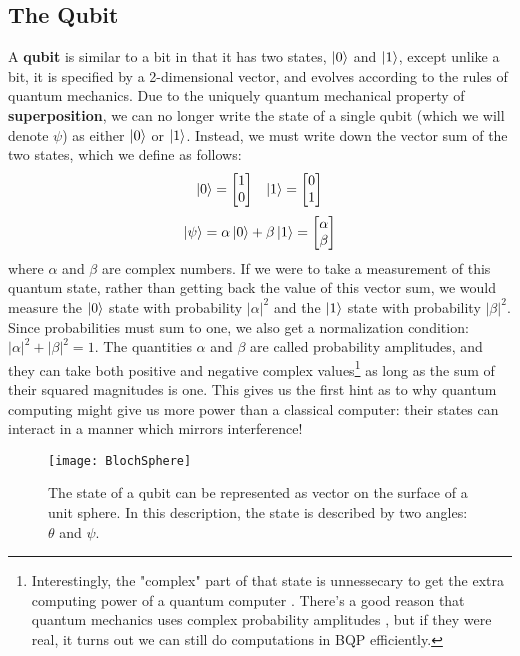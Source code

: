 \subsection{The Qubit}
A \textbf{qubit} is similar to a bit in that it has two states, $\ket{0}$ and $\ket{1}$, except unlike a bit, it is specified
by a 2-dimensional vector, and evolves according to the rules of quantum mechanics. Due to the uniquely quantum
mechanical property of \textbf{superposition}, we can no longer write the state of a single qubit (which we will
denote $\psi$) as either $\ket{0}$ or $\ket{1}$. Instead, we must write down the vector sum of the two states,
which we define as follows:
\begin{align}
  \label{eqn:basisstates}
  \ket{0} = \begin{bmatrix}1\\0\end{bmatrix} && \ket{1} = \begin{bmatrix}0\\1\end{bmatrix}
\end{align}
\begin{equation}
  \ket{\psi} = \alpha \ket{0} + \beta \ket{1} = \begin{bmatrix}\alpha\\\beta\end{bmatrix}
\end{equation}
where $\alpha$ and $\beta$ are complex numbers. If we were to take a measurement of this quantum state,
rather than getting back the value of this vector sum, we would measure the $\ket{0}$ state with probability
$|\alpha|^2$ and the $\ket{1}$ state with probability $|\beta|^2$. Since probabilities must sum to one, we also
get a normalization condition: $|\alpha|^2 + |\beta|^2 = 1$. The quantities $\alpha$ and $\beta$ are called
probability amplitudes, and they can take both positive and negative complex values\footnote{Interestingly, the "complex"
  part of that state is unnessecary to get the extra computing power
  of a quantum computer \cite{doi:10.1142/S0219749913500019}. There's a good reason that quantum mechanics
  uses complex probability amplitudes \cite{2004quant.ph..1062A}, but if they were real, it turns out
  we can still do computations in \textsc{BQP} efficiently.}
as long as the sum of their squared magnitudes is one. This gives us the first hint as to why quantum computing
might give us more power than a classical computer: their states can interact in a manner which mirrors
interference!

\begin{figure}
  \texttt{[image: BlochSphere]}
  \caption[The Bloch sphere representation of a qubit]
  {The state of a qubit can be represented as vector on the surface of a unit sphere. In this description,
  the state is described by two angles: $\theta$ and $\psi$.}
  \label{fig:bloch}
\end{figure}

